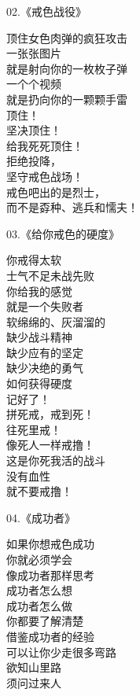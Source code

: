 \begin{multicols}{2}
    \begin{center}
        02.《戒色战役》\it

        顶住女色肉弹的疯狂攻击 \\ 一张张图片 \\ 就是射向你的一枚枚子弹 \\ 一个个视频 \\ 就是扔向你的一颗颗手雷 \\ 顶住！ \\ 坚决顶住！ \\ 给我死死顶住！ \\ 拒绝投降， \\ 坚守戒色战场！ \\ 戒色吧出的是烈士， \\ 而不是孬种、逃兵和懦夫！
    \end{center}

    \begin{center}
        03.《给你戒色的硬度》\it

        你戒得太软 \\ 士气不足未战先败 \\ 你给我的感觉 \\ 就是一个失败者 \\ 软绵绵的、灰溜溜的 \\ 缺少战斗精神 \\ 缺少应有的坚定 \\ 缺少决绝的勇气
        ~\\
        如何获得硬度 \\ 记好了！ \\ 拼死戒，戒到死！ \\ 往死里戒！ \\ 像死人一样戒撸！ \\ 这是你死我活的战斗 \\ 没有血性 \\ 就不要戒撸！
    \end{center}

    \begin{center}
        04.《成功者》\it

        如果你想戒色成功 \\ 你就必须学会 \\ 像成功者那样思考 \\ 成功者怎么想 \\ 成功者怎么做 \\ 你都要了解清楚 \\ 借鉴成功者的经验 \\ 可以让你少走很多弯路 \\ 欲知山里路 \\ 须问过来人
    \end{center}


\end{multicols}
